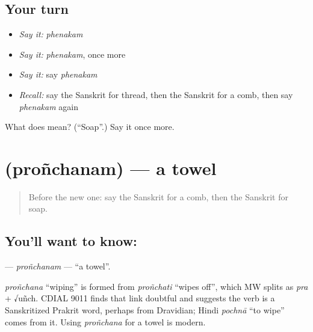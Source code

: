 \subsection*{Your turn}
\begin{itemize}
\raggedright
  \item \emph{Say it:} \emph{phenakam}
  \item \emph{Say it:} \emph{phenakam}, once more
  \item \emph{Say it:} say \emph{phenakam}
  \item \emph{Recall:} say the Sanskrit for thread, then the Sanskrit for a comb, then say \emph{phenakam} again
\end{itemize}

\begin{tcolorbox}[breakable,colback=teal!4,colframe=teal!35!black,title={Before you move on}]
What does  mean? (\textquotedblleft{}Soap\textquotedblright{}.) Say it once more.
\end{tcolorbox}
\section[\texorpdfstring{\sk{प्रोञ्छनम्} (proñchanam)}{प्रोञ्छनम् (proñchanam)}]{ (proñchanam) — a towel}

\label{lesson:SA-C101-pronchanam}



\begin{quote}
Before the new one: say the Sanskrit for a comb, then the Sanskrit for soap.
\end{quote}

\subsection*{You'll want to know: }
\textbf{} — \emph{proñchanam} — \textquotedblleft{}a towel\textquotedblright{}.

\begin{cousinweb}
\emph{proñchana} \textquotedblleft{}wiping\textquotedblright{} is formed from \emph{proñchati} \textquotedblleft{}wipes off\textquotedblright{}, which MW splits as \emph{pra} + √uñch. CDIAL 9011 finds that link doubtful and suggests the verb is a Sanskritized Prakrit word, perhaps from Dravidian; Hindi \emph{pochnā} \textquotedblleft{}to wipe\textquotedblright{} comes from it. Using \emph{proñchana} for a towel is modern.
\end{cousinweb}

